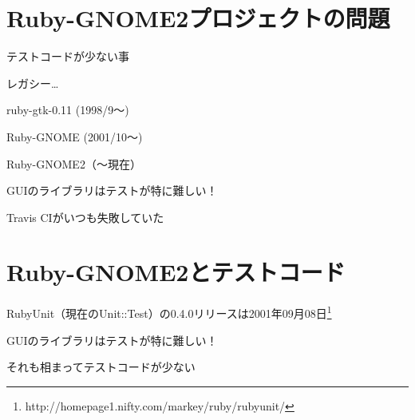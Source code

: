 \section{Ruby-GNOME2プロジェクトの問題}

\begin{frame}
\begin{itemize}
{\Large
\item テストコードが少ない事
\item レガシー…

ruby-gtk-0.11 (1998/9〜)

Ruby-GNOME (2001/10〜)

Ruby-GNOME2（〜現在）

\item GUIのライブラリはテストが特に難しい！
}
{\huge
\item Travis CIがいつも失敗していた
}
\end{itemize}
\end{frame}

\section{Ruby-GNOME2とテストコード}

\begin{frame}
\begin{itemize}
{\Large
\item RubyUnit（現在のUnit::Test）の0.4.0リリースは2001年09月08日\footnote{http://homepage1.nifty.com/markey/ruby/rubyunit/}
\item GUIのライブラリはテストが特に難しい！
\item それも相まってテストコードが少ない
}
\end{itemize}
\end{frame}

